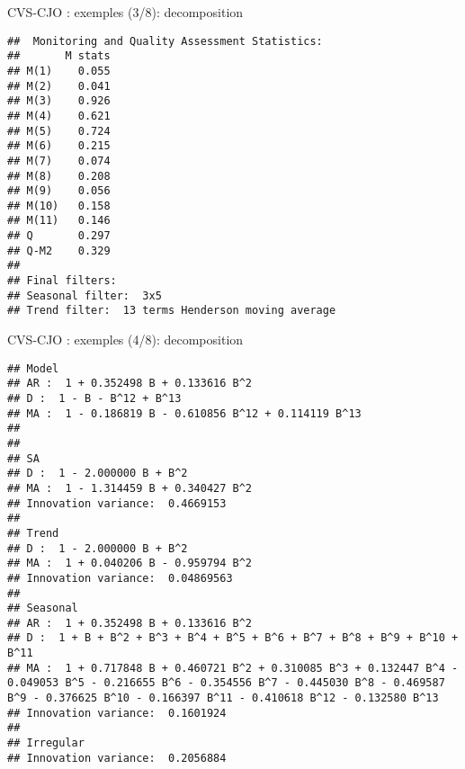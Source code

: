 \documentclass[10pt,xcolor=table,color={dvipsnames,usenames},ignorenonframetext,usepdftitle=false,french]{beamer}
\newenvironment{Shaded}{\begin{snugshade}}{\end{snugshade}}
\newcommand{\NormalTok}[1]{#1}
\newcommand{\OperatorTok}[1]{\textcolor[rgb]{0.81,0.36,0.00}{\textbf{#1}}}
\begin{document}
\begin{frame}[fragile]{CVS-CJO : exemples (3/8): decomposition}
\protect\hypertarget{cvs-cjo-exemples-38-decomposition}{}

\footnotesize

\begin{Shaded}
\end{Shaded}

\begin{verbatim}
##  Monitoring and Quality Assessment Statistics:  
##       M stats
## M(1)    0.055
## M(2)    0.041
## M(3)    0.926
## M(4)    0.621
## M(5)    0.724
## M(6)    0.215
## M(7)    0.074
## M(8)    0.208
## M(9)    0.056
## M(10)   0.158
## M(11)   0.146
## Q       0.297
## Q-M2    0.329
## 
## Final filters: 
## Seasonal filter:  3x5
## Trend filter:  13 terms Henderson moving average
\end{verbatim}

\end{frame}

\begin{frame}[fragile]{CVS-CJO : exemples (4/8): decomposition}
\protect\hypertarget{cvs-cjo-exemples-48-decomposition}{}

\footnotesize

\begin{Shaded}
\end{Shaded}

\begin{verbatim}
## Model
## AR :  1 + 0.352498 B + 0.133616 B^2 
## D :  1 - B - B^12 + B^13 
## MA :  1 - 0.186819 B - 0.610856 B^12 + 0.114119 B^13 
## 
## 
## SA
## D :  1 - 2.000000 B + B^2 
## MA :  1 - 1.314459 B + 0.340427 B^2 
## Innovation variance:  0.4669153 
## 
## Trend
## D :  1 - 2.000000 B + B^2 
## MA :  1 + 0.040206 B - 0.959794 B^2 
## Innovation variance:  0.04869563 
## 
## Seasonal
## AR :  1 + 0.352498 B + 0.133616 B^2 
## D :  1 + B + B^2 + B^3 + B^4 + B^5 + B^6 + B^7 + B^8 + B^9 + B^10 + B^11 
## MA :  1 + 0.717848 B + 0.460721 B^2 + 0.310085 B^3 + 0.132447 B^4 - 0.049053 B^5 - 0.216655 B^6 - 0.354556 B^7 - 0.445030 B^8 - 0.469587 B^9 - 0.376625 B^10 - 0.166397 B^11 - 0.410618 B^12 - 0.132580 B^13 
## Innovation variance:  0.1601924 
## 
## Irregular
## Innovation variance:  0.2056884
\end{verbatim}

\end{frame}
\end{document}
